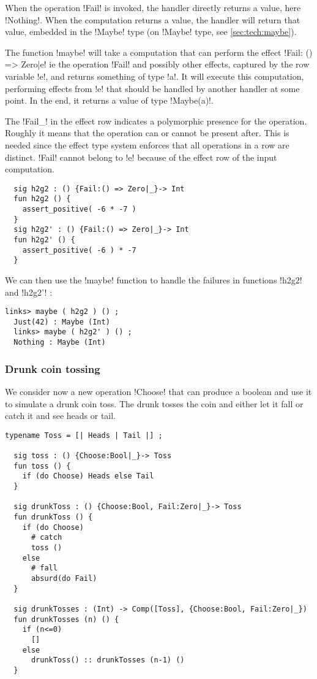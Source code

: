 \documentclass[11pt, nonacm=true, language=french, language=english]{acmart}
\begin{document}
When the operation !Fail! is invoked, the handler directly returns a value, here !Nothing!. When the computation returns a value, the handler will return that value, embedded in the !Maybe! type (on !Maybe! type, see \ref{sec:tech:maybe}).

The function !maybe! will take a computation that can perform the effect !{Fail: () => Zero|e}! ie the operation !Fail! and possibly other effects, captured by the row variable !e!, and returns something of type !a!. It will execute this computation, performing effects from !e! that should be handled by another handler at some point. In the end, it returns a value of type !Maybe(a)!.

The !Fail{_}! in the effect row indicates a polymorphic presence for the operation. Roughly it means that the operation can or cannot be present after. This is needed since the effect type system enforces that all operations in a row are distinct. !Fail! cannot belong to !e! because of the effect row of the input computation.

\begin{lstlisting}
  sig h2g2 : () {Fail:() => Zero|_}-> Int
  fun h2g2 () {
    assert_positive( -6 * -7 )
  }
  sig h2g2' : () {Fail:() => Zero|_}-> Int
  fun h2g2' () {
    assert_positive( -6 ) * -7
  }
\end{lstlisting}

We can then use the !maybe! function to handle the failures in functions !h2g2! and !h2g2'! :

\begin{lstlisting}[caption=Links console]
  links> maybe ( h2g2 ) () ;
  Just(42) : Maybe (Int)
  links> maybe ( h2g2' ) () ;
  Nothing : Maybe (Int)
\end{lstlisting}


\subsubsection{Drunk coin tossing}

We consider now a new operation !Choose! that can produce a boolean and use it to simulate a drunk coin toss. The drunk tosses the coin and either let it fall or catch it and see heads or tail.

\begin{lstlisting}[caption=Drunk toss]
  typename Toss = [| Heads | Tail |] ;

  sig toss : () {Choose:Bool|_}-> Toss
  fun toss () {
    if (do Choose) Heads else Tail
  }

  sig drunkToss : () {Choose:Bool, Fail:Zero|_}-> Toss
  fun drunkToss () {
    if (do Choose)
      # catch
      toss ()
    else
      # fall
      absurd(do Fail)
  }

  sig drunkTosses : (Int) -> Comp([Toss], {Choose:Bool, Fail:Zero|_})
  fun drunkTosses (n) () {
    if (n<=0)
      []
    else
      drunkToss() :: drunkTosses (n-1) ()
  }
\end{lstlisting}
\end{document}
